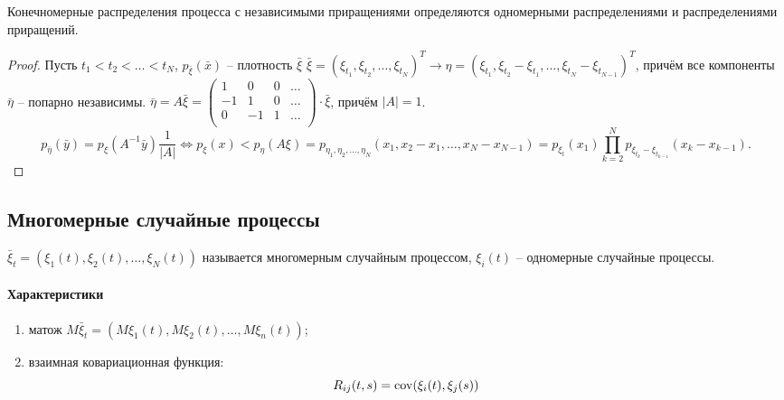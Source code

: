 \begin{theorem}
  Конечномерные распределения процесса с независимыми приращениями определяются 
  одномерными распределениями и распределениями приращений.
\end{theorem}
\begin{proof}
  Пусть $t_1 < t_2 < \dots < t_N$, $p_{\bar{\xi}} ( \bar{x})$ -- плотность $\bar{\xi}$
  $\bar{\xi} = (\xi_{t_1}, \xi_{t_2}, \dots, \xi_{t_N})^T \to \eta = (\xi_{t_1}, \xi_{t_2}-\xi_{t_1}, \dots, \xi_{t_N} - \xi_{t_{N-1}})^T$, причём все компоненты $\bar{\eta}$ -- попарно независимы.
  $\bar{\eta} = A \bar{\xi} = \begin{pmatrix}
    1 & 0 & 0 & \dots \\
    -1 & 1 & 0 & \dots \\
    0 & -1 & 1 & \dots \\
  \end{pmatrix} \cdot \bar{\xi}$, причём $|A| = 1$.
  \[
    p_{\bar{\eta}} ( \bar{y} ) = p_{\xi} (A^{-1} \bar{y}) \dfrac{1}{|A|}
    \Leftrightarrow
    p_\xi(x) < p_\eta (A\xi) = p_{\eta_1, \eta_2, \dots, \eta_N} (x_1, x_2-x_1, \dots, x_N - x_{N-1}) = p_{\xi_t} (x_1) \prod_{k=2}^N p_{\xi_{t_k} - \xi_{t_{k-1}}} (x_k - x_{k-1}).
  \]
\end{proof}

\subsection{Многомерные случайные процессы}

\begin{definition}
  $\bar{\xi}_t = (\xi_1 (t), \xi_2 (t), \dots, \xi_N(t))$ называется многомерным случайным
  процессом, $\xi_i(t)$ -- одномерные случайные процессы.
\end{definition}

\paragraph{Характеристики}
\begin{enumerate}
  \item матож $M\bar{\xi}_t = (M\xi_1(t), M\xi_2(t), \dots, M\xi_n(t))$;
  \item взаимная ковариационная функция:
    \[
      R_{ij}(t, s) = \operatorname{cov}(\xi_i (t), \xi_j (s))
    \]
\end{enumerate}

